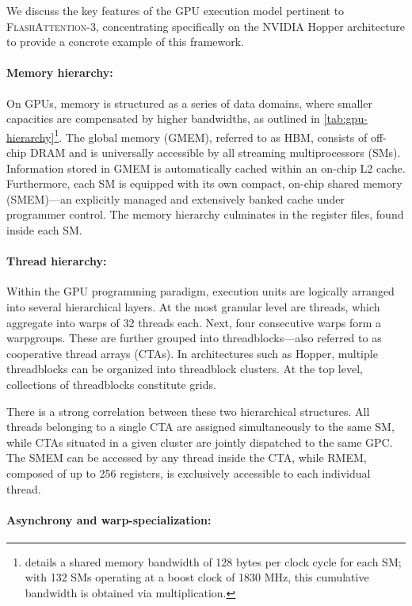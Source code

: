 We discuss the key features of the GPU execution model pertinent to \textsc{FlashAttention-3}, concentrating specifically on the NVIDIA Hopper architecture to provide a concrete example of this framework.

\paragraph{Memory hierarchy:} On GPUs, memory is structured as a series of data domains, where smaller capacities are compensated by higher bandwidths, as outlined in \cref{tab:gpu-hierarchy}\footnote{\citet{luo2024benchmarking} details a shared memory bandwidth of 128 bytes per clock cycle for each SM; with 132 SMs operating at a boost clock of 1830 MHz, this cumulative bandwidth is obtained via multiplication.}. The global memory (GMEM), referred to as HBM, consists of off-chip DRAM and is universally accessible by all streaming multiprocessors (SMs). Information stored in GMEM is automatically cached within an on-chip L2 cache. Furthermore, each SM is equipped with its own compact, on-chip shared memory (SMEM)—an explicitly managed and extensively banked cache under programmer control. The memory hierarchy culminates in the register files, found inside each SM.

\paragraph{Thread hierarchy:} Within the GPU programming paradigm, execution units are logically arranged into several hierarchical layers. At the most granular level are threads, which aggregate into warps of 32 threads each. Next, four consecutive warps form a warpgroups. These are further grouped into threadblocks—also referred to as cooperative thread arrays (CTAs). In architectures such as Hopper, multiple threadblocks can be organized into threadblock clusters. At the top level, collections of threadblocks constitute grids.

There is a strong correlation between these two hierarchical structures. All threads belonging to a single CTA are assigned simultaneously to the same SM, while CTAs situated in a given cluster are jointly dispatched to the same GPC. The SMEM can be accessed by any thread inside the CTA, while RMEM, composed of up to 256 registers, is exclusively accessible to each individual thread.

\paragraph{Asynchrony and warp-specialization:}

